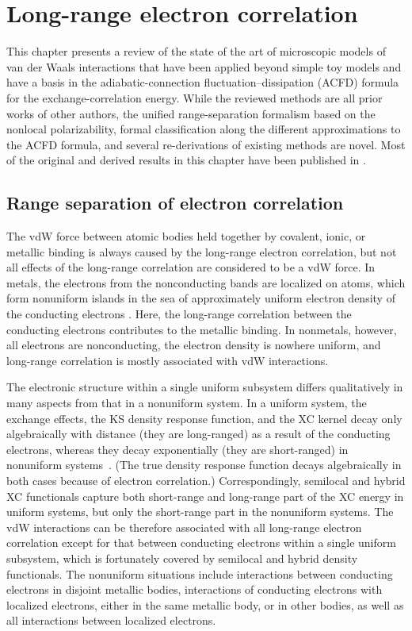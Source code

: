 \chapter{Long-range electron correlation}\label{chap:vdw-methods}

{\sffamily This chapter presents a review of the state of the art of microscopic models of van der Waals interactions that have been applied beyond simple toy models and have a basis in the adiabatic-connection fluctuation--dissipation (ACFD) formula for the exchange-correlation energy.
While the reviewed methods are all prior works of other authors, the unified range-separation formalism based on the nonlocal polarizability, formal classification along the different approximations to the ACFD formula, and several re-derivations of existing methods are novel.
Most of the original and derived results in this chapter have been published in \citep{HermannCR17}.
}

\section{Range separation of electron correlation}\label{sec:range-separation}

The vdW force between atomic bodies held together by covalent, ionic, or metallic binding is always caused by the long-range electron correlation, but not all effects of the long-range correlation are considered to be a vdW force.
In metals, the electrons from the nonconducting bands are localized on atoms, which form nonuniform islands in the sea of approximately uniform electron density of the conducting electrons \citep{TaoPRB10}.
Here, the long-range correlation between the conducting electrons contributes to the metallic binding.
In nonmetals, however, all electrons are nonconducting, the electron density is nowhere uniform, and long-range correlation is mostly associated with vdW interactions.

The electronic structure within a single uniform subsystem differs qualitatively in many aspects from that in a nonuniform system.
In a uniform system, the exchange effects, the KS density response function, and the XC kernel decay only algebraically with distance (they are long-ranged) as a result of the conducting electrons, whereas they decay exponentially (they are short-ranged) in nonuniform systems~\cite{GePRB15}.
(The true density response function decays algebraically in both cases because of electron correlation.)
Correspondingly, semilocal and hybrid XC functionals capture both short-range and long-range part of the XC energy in uniform systems, but only the short-range part in the nonuniform systems.
The vdW interactions can be therefore associated with all long-range electron correlation except for that between conducting electrons within a single uniform subsystem, which is fortunately covered by semilocal and hybrid density functionals.
The nonuniform situations include interactions between conducting electrons in disjoint metallic bodies, interactions of conducting electrons with localized electrons, either in the same metallic body, or in other bodies, as well as all interactions between localized electrons.

